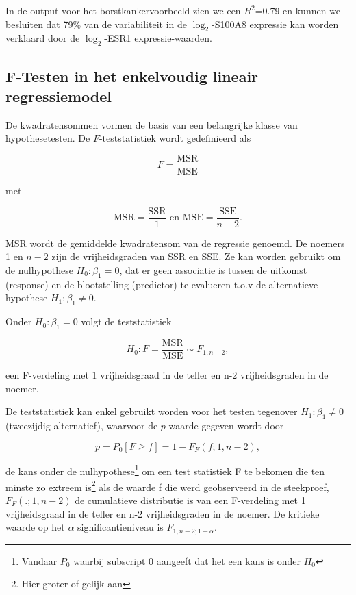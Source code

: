 \documentclass[
  12pt,dutch,coursenotes]{book}
\begin{document}
In de output voor het borstkankervoorbeeld zien we een \(R^2\)=0.79 en kunnen we besluiten dat 79\% van de variabiliteit in de \(\log_2\)-S100A8 expressie kan worden verklaard door de \(\log_2\)-ESR1 expressie-waarden.

\hypertarget{f-testen-in-het-enkelvoudig-lineair-regressiemodel}{%
\subsection{F-Testen in het enkelvoudig lineair regressiemodel}\label{f-testen-in-het-enkelvoudig-lineair-regressiemodel}}

De kwadratensommen vormen de basis van een belangrijke klasse van hypothesetesten.
De \(F\)-teststatistiek wordt gedefinieerd als

\[  F  = \frac{\text{MSR}}{\text{MSE}}\]

met

\[\text{MSR} = \frac{\text{SSR}}{1} \text{ en } \text{MSE} = \frac{\text{SSE}}{n-2}.\]

MSR wordt de gemiddelde kwadratensom van de regressie genoemd. De noemers 1 en \(n-2\) zijn de vrijheidsgraden van SSR en SSE.
Ze kan worden gebruikt om de nulhypothese \(H_0: \beta_1=0\), dat er geen associatie is tussen de uitkomst (response) en de blootstelling (predictor) te evalueren t.o.v de alternatieve hypothese \(H_1: \beta_1\neq0\).

Onder \(H_0: \beta_1=0\) volgt de teststatistiek

\[H_0:F = \frac{\text{MSR}}{\text{MSE}} \sim F_{1,n-2},\]

een F-verdeling met 1 vrijheidsgraad in de teller en n-2 vrijheidsgraden in de noemer.

De teststatistiek kan enkel gebruikt worden voor het testen tegenover \(H_1:\beta_1\neq 0\) (tweezijdig alternatief), waarvoor de \(p\)-waarde gegeven wordt door

\[  p = P_0\left[F\geq f\right]=1-F_F(f;1,n-2),\]

de kans onder de nulhypothese\footnote{Vandaar \(P_0\) waarbij subscript 0 aangeeft dat het een kans is onder \(H_0\)} om een test statistiek F te bekomen die ten minste zo extreem is\footnote{Hier groter of gelijk aan} als de waarde f die werd geobserveerd in de steekproef, \(F_F(.;1,n-2)\) de cumulatieve distributie is van een F-verdeling met 1 vrijheidsgraad in de teller en n-2 vrijheidsgraden in de noemer. De kritieke waarde op het \(\alpha\) significantieniveau is \(F_{1,n-2;1-\alpha}\).
\end{document}
